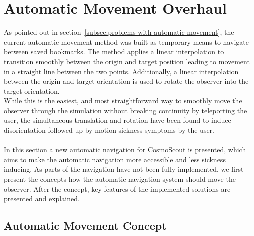 \section{Automatic Movement Overhaul}\label{sec:automatic-movement-overhaul}

As pointed out in section~\ref{subsec:problems-with-automatic-movement}, the current automatic movement method was
built as temporary means to navigate between saved bookmarks.
The method applies a linear interpolation to transition smoothly between the origin and target position leading to
movement in a straight line between the two points.
Additionally, a linear interpolation between the origin and target orientation is used to rotate the observer into the
target orientation.
\\
While this is the easiest, and most straightforward way to smoothly move the observer through the simulation without
breaking continuity by teleporting the user, the simultaneous translation and rotation have been found to induce
disorientation followed up by motion sickness symptoms by the user.
\\
\\
In this section a new automatic navigation for CosmoScout is presented, which aims to make the automatic navigation
more accessible and less sickness inducing.
As parts of the navigation have not been fully implemented, we first present the concepts how the automatic
navigation system should move the observer.
After the concept, key features of the implemented solutions are presented and explained.


\subsection{Automatic Movement Concept}\label{subsec:automatic-movement-concept}

